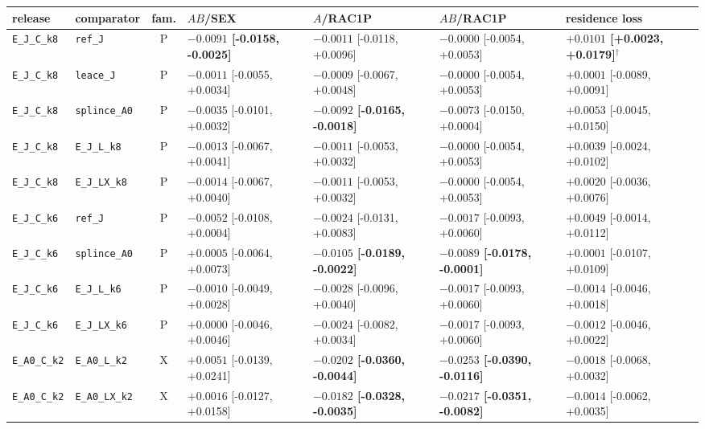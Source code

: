 \begin{tabular}{@{}l l c l l l l@{}}
\toprule
release & comparator & fam. & $AB$/SEX & $A$/RAC1P & $AB$/RAC1P & residence loss \\
\midrule
\texttt{E\_J\_C\_k8} & \texttt{ref\_J} & P & \textbf{$-0.0091$ {\tiny[-0.0158, -0.0025]}} & $-0.0011$ {\tiny[-0.0118, +0.0096]} & $-0.0000$ {\tiny[-0.0054, +0.0053]} & \textbf{$+0.0101$ {\tiny[+0.0023, +0.0179]}}$^\dagger$ \\
\texttt{E\_J\_C\_k8} & \texttt{leace\_J} & P & $-0.0011$ {\tiny[-0.0055, +0.0034]} & $-0.0009$ {\tiny[-0.0067, +0.0048]} & $-0.0000$ {\tiny[-0.0054, +0.0053]} & $+0.0001$ {\tiny[-0.0089, +0.0091]} \\
\texttt{E\_J\_C\_k8} & \texttt{splince\_A0} & P & $-0.0035$ {\tiny[-0.0101, +0.0032]} & \textbf{$-0.0092$ {\tiny[-0.0165, -0.0018]}} & $-0.0073$ {\tiny[-0.0150, +0.0004]} & $+0.0053$ {\tiny[-0.0045, +0.0150]} \\
\texttt{E\_J\_C\_k8} & \texttt{E\_J\_L\_k8} & P & $-0.0013$ {\tiny[-0.0067, +0.0041]} & $-0.0011$ {\tiny[-0.0053, +0.0032]} & $-0.0000$ {\tiny[-0.0054, +0.0053]} & $+0.0039$ {\tiny[-0.0024, +0.0102]} \\
\texttt{E\_J\_C\_k8} & \texttt{E\_J\_LX\_k8} & P & $-0.0014$ {\tiny[-0.0067, +0.0040]} & $-0.0011$ {\tiny[-0.0053, +0.0032]} & $-0.0000$ {\tiny[-0.0054, +0.0053]} & $+0.0020$ {\tiny[-0.0036, +0.0076]} \\
\texttt{E\_J\_C\_k6} & \texttt{ref\_J} & P & $-0.0052$ {\tiny[-0.0108, +0.0004]} & $-0.0024$ {\tiny[-0.0131, +0.0083]} & $-0.0017$ {\tiny[-0.0093, +0.0060]} & $+0.0049$ {\tiny[-0.0014, +0.0112]} \\
\texttt{E\_J\_C\_k6} & \texttt{splince\_A0} & P & $+0.0005$ {\tiny[-0.0064, +0.0073]} & \textbf{$-0.0105$ {\tiny[-0.0189, -0.0022]}} & \textbf{$-0.0089$ {\tiny[-0.0178, -0.0001]}} & $+0.0001$ {\tiny[-0.0107, +0.0109]} \\
\texttt{E\_J\_C\_k6} & \texttt{E\_J\_L\_k6} & P & $-0.0010$ {\tiny[-0.0049, +0.0028]} & $-0.0028$ {\tiny[-0.0096, +0.0040]} & $-0.0017$ {\tiny[-0.0093, +0.0060]} & $-0.0014$ {\tiny[-0.0046, +0.0018]} \\
\texttt{E\_J\_C\_k6} & \texttt{E\_J\_LX\_k6} & P & $+0.0000$ {\tiny[-0.0046, +0.0046]} & $-0.0024$ {\tiny[-0.0082, +0.0034]} & $-0.0017$ {\tiny[-0.0093, +0.0060]} & $-0.0012$ {\tiny[-0.0046, +0.0022]} \\
\midrule
\texttt{E\_A0\_C\_k2} & \texttt{E\_A0\_L\_k2} & X & $+0.0051$ {\tiny[-0.0139, +0.0241]} & \textbf{$-0.0202$ {\tiny[-0.0360, -0.0044]}} & \textbf{$-0.0253$ {\tiny[-0.0390, -0.0116]}} & $-0.0018$ {\tiny[-0.0068, +0.0032]} \\
\texttt{E\_A0\_C\_k2} & \texttt{E\_A0\_LX\_k2} & X & $+0.0016$ {\tiny[-0.0127, +0.0158]} & \textbf{$-0.0182$ {\tiny[-0.0328, -0.0035]}} & \textbf{$-0.0217$ {\tiny[-0.0351, -0.0082]}} & $-0.0014$ {\tiny[-0.0062, +0.0035]} \\
\bottomrule
\end{tabular}
